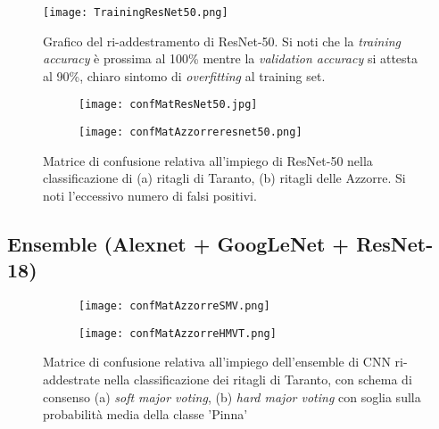 \begin{appendices}
\begin{figure}[h]
  \centering
  \texttt{[image: TrainingResNet50.png]}
  
  \caption{Grafico del ri-addestramento di ResNet-50. Si noti che la \textit{training accuracy} è prossima al 100\% mentre la \textit{validation accuracy} si attesta al 90\%, chiaro sintomo di \textit{overfitting} al training set.}

\end{figure}


\begin{figure}[h!]
  \centering
  \begin{subfigure}[b]{0.45\linewidth}
    \texttt{[image: confMatResNet50.jpg]}
    \caption{}
  \end{subfigure}
  \begin{subfigure}[b]{0.45\linewidth}
    \texttt{[image: confMatAzzorreresnet50.png]}
    \caption{}
  \end{subfigure}
  
  \caption{Matrice di confusione relativa all'impiego di ResNet-50 nella classificazione di (a) ritagli di Taranto, (b) ritagli delle Azzorre. Si noti l'eccessivo numero di falsi positivi.}

\end{figure}

\vfill
\pagebreak[4]

\subsection{Ensemble (Alexnet + GoogLeNet + ResNet-18)}

\begin{figure}[h!]
  \centering
  \begin{subfigure}[b]{0.45\linewidth}
    \texttt{[image: confMatAzzorreSMV.png]}
    \caption{}
  \end{subfigure}
  \begin{subfigure}[b]{0.45\linewidth}
    \texttt{[image: confMatAzzorreHMVT.png]}
    \caption{}
  \end{subfigure}
  
  \caption{Matrice di confusione relativa all'impiego dell'ensemble di CNN ri-addestrate nella classificazione dei ritagli di Taranto, con schema di consenso (a) \textit{soft major voting}, (b) \textit{hard major voting} con soglia sulla probabilità media della classe 'Pinna'}

\end{figure}


\end{appendices}